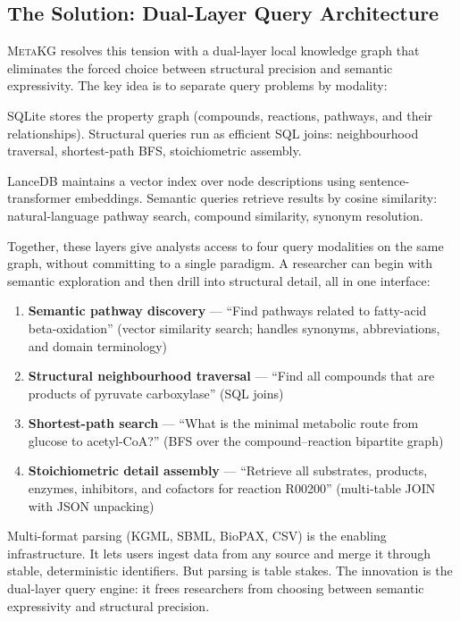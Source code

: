 \documentclass[10pt]{article}
\begin{document}
\subsection{The Solution: Dual-Layer Query Architecture}

\textsc{MetaKG} resolves this tension with a dual-layer local knowledge graph
that eliminates the forced choice between structural precision and semantic
expressivity. The key idea is to separate query problems by modality:

\begin{description}[leftmargin=*,itemsep=2pt]
\item[Structural layer.] SQLite stores the property graph (compounds,
  reactions, pathways, and their relationships). Structural queries run as
  efficient SQL joins: neighbourhood traversal, shortest-path BFS,
  stoichiometric assembly.
\item[Semantic layer.] LanceDB maintains a vector index over node descriptions
  using sentence-transformer embeddings. Semantic queries retrieve results by
  cosine similarity: natural-language pathway search, compound similarity,
  synonym resolution.
\end{description}

Together, these layers give analysts access to four query modalities on the
same graph, without committing to a single paradigm. A researcher can begin
with semantic exploration and then drill into structural detail, all in one
interface:

\begin{enumerate}[leftmargin=*, itemsep=2pt]
\item \textbf{Semantic pathway discovery} --- ``Find pathways related to
  fatty-acid beta-oxidation'' (vector similarity search; handles synonyms,
  abbreviations, and domain terminology)
\item \textbf{Structural neighbourhood traversal} --- ``Find all compounds
  that are products of pyruvate carboxylase'' (SQL joins)
\item \textbf{Shortest-path search} --- ``What is the minimal metabolic route
  from glucose to acetyl-CoA?'' (BFS over the compound--reaction bipartite
  graph)
\item \textbf{Stoichiometric detail assembly} --- ``Retrieve all substrates,
  products, enzymes, inhibitors, and cofactors for reaction R00200''
  (multi-table JOIN with JSON unpacking)
\end{enumerate}

Multi-format parsing (KGML, SBML, BioPAX, CSV) is the enabling
infrastructure. It lets users ingest data from any source and merge it through
stable, deterministic identifiers. But parsing is table stakes. The innovation
is the dual-layer query engine: it frees researchers from choosing between
semantic expressivity and structural precision.
\end{document}
